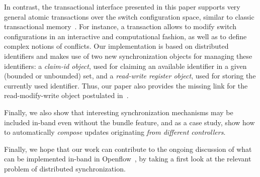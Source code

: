 \documentclass[conference]{sigcomm-alternate}
\begin{document}
In contrast, the transactional interface presented in this paper supports very general atomic
transactions over the switch configuration space, similar to classic transactional memory~\cite{stm-st95,tm-book}.
For instance, a transaction allows to modify switch configurations in an interactive
and computational fashion, as well as to define complex notions
of conflicts.
Our implementation is based on distributed identifiers and makes use of two
new synchronization objects for managing these identifiers:
a \emph{claim-id object}, used for claiming an available identifier in a given
(bounded or unbounded) set, and a \emph{read-write register object}, used for storing the
currently used identifier.
Thus, our paper also provides the missing link for the read-modify-write object
postulated in~\cite{cpc}.

Finally, we also show that interesting synchronization mechanisms may be included
in-band even without the bundle feature, and as a case study, show
how to automatically \emph{compose} updates originating \emph{from different controllers}.

Finally, we hope that our work can contribute to the ongoing discussion of what can be implemented
in-band in Openflow~\cite{compute,reclaim}, by taking a first look
at the relevant problem of distributed
synchronization.

\end{document}
